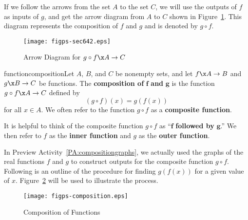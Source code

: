 If we follow the arrows from the set  $A$  to the set  $C$, we will use the outputs of  $f$  as inputs of  $g$, and get the arrow diagram from  $A$  to  $C$ shown in Figure~\ref{fig:arrow64-2}.  This diagram represents the composition of  $f$  and  $g$  and is denoted by  $g \circ f$\!.
\begin{figure}[h]
\begin{center}
\texttt{[image: figps-sec642.eps]} 
\caption{Arrow Diagram for $g \circ f\x  A \to C$} \label{fig:arrow64-2}
\end{center}
\end{figure}
%
\begin{defbox}{functioncomposition}{Let  $A$, $B$, and  $C$  be nonempty sets, and let  
$f\x A \to B$  and  $g\x B \to C$  be functions.  The \textbf{composition of}
%
%
  $\boldsymbol{f}$ \textbf{and} $\boldsymbol{g}$  is the function  $g \circ f\x A \to C$  defined by
\label{sym:composition}
\[
( {g \circ f} )( x ) = g\left( {f( x )} \right)
\]
for all  $x \in A$.  We often refer to the function  $g \circ f$ as a \textbf{composite function}.
%
%
}
\end{defbox} 
%
It is helpful to think of the composite function  $g \circ f$
 as  ``$\boldsymbol{f}$  \textbf{followed by}  $\boldsymbol{g}$.''  We then refer to  $f$  as the \textbf{inner function}
%
%
 and  $g$  as the \textbf{outer function}.
%
%

In Preview Activity~\ref{PA:compositiongraphs}, we actually used the graphs of the real functions  $f$  and  $g$  to construct outputs for the composite function $g \circ f$.  Following is an outline of the procedure for finding $g( {f( x )} )$ for a given value of  $x$.  Figure~\ref{fig:functioncomposition2} will be used to illustrate the process.

\begin{figure}[h]
\begin{center}
\texttt{[image: figps-composition.eps]}
\caption{Composition of Functions} \label{fig:functioncomposition2}
\end{center}
\end{figure}


